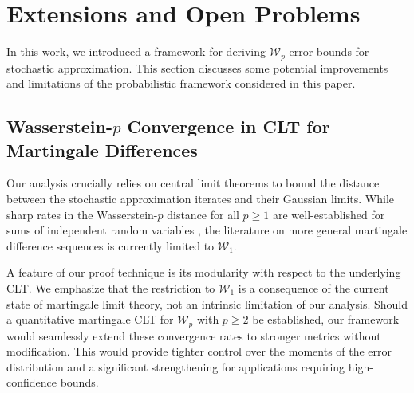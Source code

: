 \documentclass[11pt]{article}
\begin{document}
\section{Extensions and Open Problems}
In this work, we introduced a framework for deriving $\mathcal{W}_p$ error bounds for stochastic approximation. 
This section discusses some potential improvements and limitations of the probabilistic framework considered in this paper. 




\subsection{Wasserstein-$p$ Convergence in CLT for Martingale Differences}
Our analysis crucially relies on \nonasymptotic central limit theorems to bound the distance between the stochastic approximation iterates and their Gaussian limits. 
While sharp rates in the Wasserstein-$p$ distance for all $p \geq 1$ are well-established for sums of independent random variables \citep{bonis2020steinsmethodnormalapproximation,bonis2024improved}, the literature on more general martingale difference sequences is currently limited to $\mathcal{W}_1$.



A feature of our proof technique is its modularity with respect to the underlying CLT. 
We emphasize that the restriction to $\mathcal{W}_1$ is a consequence of the current state of martingale limit theory, not an intrinsic limitation of our analysis. 
Should a quantitative martingale CLT for $\mathcal{W}_p$ with $p \geq 2$ be established, our framework would seamlessly extend these convergence rates to stronger metrics without modification. 
This would provide tighter control over the moments of the error distribution and a significant strengthening for applications requiring high-confidence bounds. 
\end{document}
